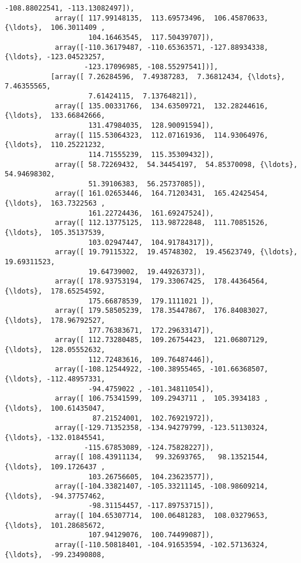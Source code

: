 \documentclass[11pt]{article}
\begin{document}
\begin{Verbatim}[commandchars=\\\{\}]
                   -108.88022541, -113.13082497]),
            array([ 117.99148135,  113.69573496,  106.45870633, {\ldots},  106.3011409 ,
                    104.16463545,  117.50439707]),
            array([-110.36179487, -110.65363571, -127.88934338, {\ldots}, -123.04523257,
                   -123.17096985, -108.55297541])],
           [array([ 7.26284596,  7.49387283,  7.36812434, {\ldots},  7.46355565,
                    7.61424115,  7.13764821]),
            array([ 135.00331766,  134.63509721,  132.28244616, {\ldots},  133.66842666,
                    131.47984035,  128.90091594]),
            array([ 115.53064323,  112.07161936,  114.93064976, {\ldots},  110.25221232,
                    114.71555239,  115.35309432]),
            array([ 58.72269432,  54.34454197,  54.85370098, {\ldots},  54.94698302,
                    51.39106383,  56.25737085]),
            array([ 161.02653446,  164.71203431,  165.42425454, {\ldots},  163.7322563 ,
                    161.22724436,  161.69247524]),
            array([ 112.13775125,  113.98722848,  111.70851526, {\ldots},  105.35137539,
                    103.02947447,  104.91784317]),
            array([ 19.79115322,  19.45748302,  19.45623749, {\ldots},  19.69311523,
                    19.64739002,  19.44926373]),
            array([ 178.93753194,  179.33067425,  178.44364564, {\ldots},  178.65254592,
                    175.66878539,  179.1111021 ]),
            array([ 179.58505239,  178.35447867,  176.84083027, {\ldots},  178.96792527,
                    177.76383671,  172.29633147]),
            array([ 112.73280485,  109.26754423,  121.06807129, {\ldots},  128.05552632,
                    112.72483616,  109.76487446]),
            array([-108.12544922, -100.38955465, -101.66368507, {\ldots}, -112.48957331,
                    -94.4759022 , -101.34811054]),
            array([ 106.75341599,  109.2943711 ,  105.3934183 , {\ldots},  100.61435047,
                     87.21524001,  102.76921972]),
            array([-129.71352358, -134.94279799, -123.51130324, {\ldots}, -132.01845541,
                   -115.67853089, -124.75828227]),
            array([ 108.43911134,   99.32693765,   98.13521544, {\ldots},  109.1726437 ,
                    103.26756605,  104.23623577]),
            array([-104.33821407, -105.33211145, -108.98609214, {\ldots},  -94.37757462,
                    -98.31154457, -117.89753715]),
            array([ 104.65307714,  100.06481283,  108.03279653, {\ldots},  101.28685672,
                    107.94129076,  100.74499087]),
            array([-110.50818401, -104.91653594, -102.57136324, {\ldots},  -99.23490808,

\end{Verbatim}
\end{document}
